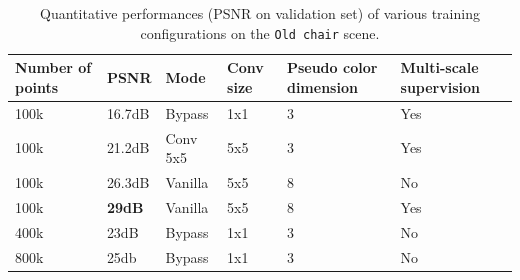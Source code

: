 

\begin{table}[htpb]
    \begin{tabular}{|l|l|l|l|l|l|}
    \hline
    Number of points & PSNR   & Mode     & Conv size & Pseudo color dimension & Multi-scale supervision \\ \hline
    100k             & 16.7dB & Bypass   & 1x1               & 3                      & Yes                     \\ \hline
    100k             & 21.2dB & Conv 5x5 & 5x5               & 3                      & Yes                     \\ \hline
    100k             & 26.3dB & Vanilla  & 5x5               & 8                      & No                      \\ \hline
    100k             & \textbf{29dB}   & Vanilla  & 5x5               & 8                      & Yes                     \\ \hline
    400k             & 23dB   & Bypass   & 1x1               & 3                      & No                      \\ \hline
    800k             & 25db   & Bypass   & 1x1               & 3                      & No                      \\ \hline
\end{tabular}
\caption{Quantitative performances (PSNR on validation set) of various training configurations on the \texttt{Old chair} scene.}
\label{tab:results}
\end{table}


